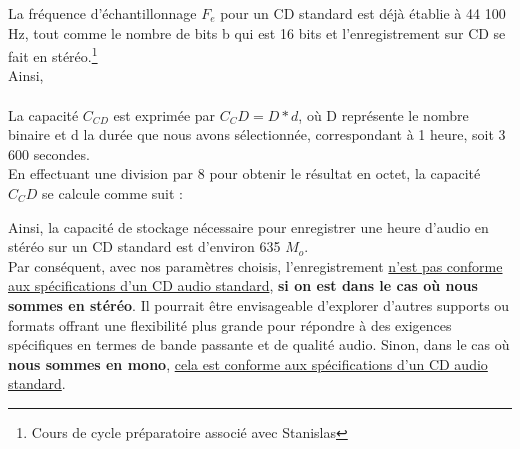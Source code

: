 La fréquence d'échantillonnage $F_e$ pour un CD standard est déjà établie à 44 100 Hz, tout comme le nombre de bits b qui est 16 bits et l'enregistrement sur CD se fait en stéréo.\footnote{Cours de cycle préparatoire associé avec Stanislas}
\\
Ainsi,
\\
\\
La capacité $C_{CD}$ est exprimée par $C_CD = D * d$, où D représente le nombre binaire et d la durée que nous avons sélectionnée, correspondant à 1 heure, soit 3 600 secondes.
\\
En effectuant une division par 8 pour obtenir le résultat en octet, la capacité $C_CD$ se calcule comme suit :
\\


Ainsi, la capacité de stockage nécessaire pour enregistrer une heure d'audio en stéréo sur un CD standard est d'environ 635 $M_o$.
\\

Par conséquent, avec nos paramètres choisis, l'enregistrement \uline{n'est pas conforme aux spécifications d'un CD audio standard}, \textbf{si on est dans le cas où nous sommes en stéréo}. Il pourrait être envisageable d'explorer d'autres supports ou formats offrant une flexibilité plus grande pour répondre à des exigences spécifiques en termes de bande passante et de qualité audio. Sinon, dans le cas où \textbf{nous sommes en mono}, \uline{cela est conforme aux spécifications d'un CD audio standard}.

